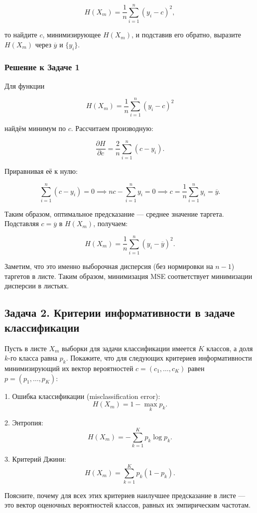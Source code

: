 \[
H(X_m) = \frac{1}{n} \sum_{i=1}^n (y_i - c)^2,
\]

то найдите \(c\), минимизирующее \(H(X_m)\), и подставив его обратно, выразите \(H(X_m)\) через \(\overline{y}\) и \(\{y_i\}\).

\subsubsection*{Решение к Задаче 1}

Для функции

\[
H(X_m) = \frac{1}{n} \sum_{i=1}^n (y_i - c)^2
\]

найдём минимум по \(c\). Рассчитаем производную:

\[
\frac{\partial H}{\partial c} = \frac{2}{n} \sum_{i=1}^n (c - y_i).
\]

Приравнивая её к нулю:

\[
\sum_{i=1}^n (c - y_i) = 0 \implies nc - \sum_{i=1}^n y_i = 0 \implies c = \frac{1}{n}\sum_{i=1}^n y_i = \overline{y}.
\]

Таким образом, оптимальное предсказание — среднее значение таргета. Подставляя \(c = \overline{y}\) в \(H(X_m)\), получаем:

\[
H(X_m) = \frac{1}{n} \sum_{i=1}^n (y_i - \overline{y})^2.
\]

Заметим, что это именно выборочная дисперсия (без нормировки на \(n-1\)) таргетов в листе. Таким образом, минимизация MSE соответствует минимизации дисперсии в листьях.


\subsection*{Задача 2. Критерии информативности в задаче классификации}

Пусть в листе \(X_m\) выборки для задачи классификации имеется \(K\) классов, а доля \(k\)-го класса равна \(p_k\). Покажите, что для следующих критериев информативности минимизирующий их вектор вероятностей \(c = (c_1, \ldots, c_K)\) равен \(p = (p_1, \ldots, p_K)\):

1. Ошибка классификации (misclassification error): 
\[
H(X_m) = 1 - \max_k p_k.
\]

2. Энтропия:
\[
H(X_m) = -\sum_{k=1}^K p_k \log p_k.
\]

3. Критерий Джини:
\[
H(X_m) = \sum_{k=1}^K p_k(1 - p_k).
\]

Поясните, почему для всех этих критериев наилучшее предсказание в листе — это вектор оценочных вероятностей классов, равных их эмпирическим частотам.

